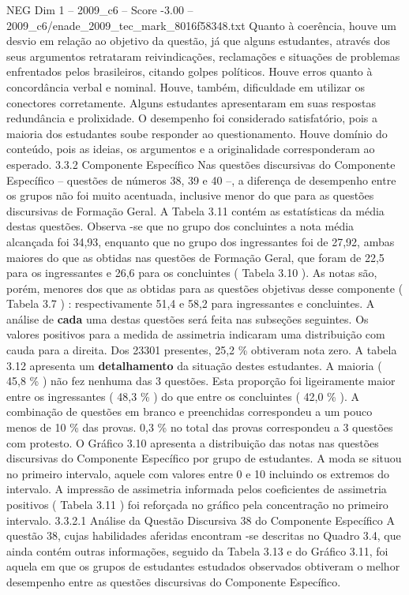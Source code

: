 \begin{textsample}{NEG Dim 1 – 2009\_c6 – Score -3.00 – 2009\_c6/enade\_2009\_tec\_mark\_8016f58348.txt}
Quanto à coerência, houve um desvio em relação ao objetivo da questão, já que alguns estudantes, através dos seus argumentos retrataram reivindicações, reclamações e situações de problemas enfrentados pelos brasileiros, citando golpes políticos.
Houve erros quanto à concordância verbal e nominal.
Houve, também, dificuldade em utilizar os conectores corretamente.
Alguns estudantes apresentaram em suas respostas redundância e prolixidade.
O desempenho foi considerado satisfatório, pois a maioria dos estudantes soube responder ao questionamento.
Houve domínio do conteúdo, pois as ideias, os argumentos e a originalidade corresponderam ao esperado. 3.3.2 Componente Específico Nas questões discursivas do Componente Específico – questões de números 38, 39 e 40 –, a diferença de desempenho entre os grupos não foi muito acentuada, inclusive menor do que para as questões discursivas de Formação Geral.
A Tabela 3.11 contém as estatísticas da média destas questões.
Observa -se que no grupo dos concluintes a nota média alcançada foi 34,93, enquanto que no grupo dos ingressantes foi de 27,92, ambas maiores do que as obtidas nas questões de Formação Geral, que foram de 22,5 para os ingressantes e 26,6 para os concluintes ( Tabela 3.10 ).
As notas são, porém, menores dos que as obtidas para as questões objetivas desse componente ( Tabela 3.7 ) : respectivamente 51,4 e 58,2 para ingressantes e concluintes.
A análise de \textbf{cada} uma destas questões será feita nas subseções seguintes.
Os valores positivos para a medida de assimetria indicaram uma distribuição com cauda para a direita.
Dos 23301 presentes, 25,2 \% obtiveram nota zero.
A tabela 3.12 apresenta um \textbf{detalhamento} da situação destes estudantes.
A maioria ( 45,8 \% ) não fez nenhuma das 3 questões.
Esta proporção foi ligeiramente maior entre os ingressantes ( 48,3 \% ) do que entre os concluintes ( 42,0 \% ).
A combinação de questões em branco e preenchidas correspondeu a um pouco menos de 10 \% das provas. 0,3 \% no total das provas correspondeu a 3 questões com protesto.
O Gráfico 3.10 apresenta a distribuição das notas nas questões discursivas do Componente Específico por grupo de estudantes.
A moda se situou no primeiro intervalo, aquele com valores entre 0 e 10 incluindo os extremos do intervalo.
A impressão de assimetria informada pelos coeficientes de assimetria positivos ( Tabela 3.11 ) foi reforçada no gráfico pela concentração no primeiro intervalo. 3.3.2.1 Análise da Questão Discursiva 38 do Componente Específico A questão 38, cujas habilidades aferidas encontram -se descritas no Quadro 3.4, que ainda contém outras informações, seguido da Tabela 3.13 e do Gráfico 3.11, foi aquela em que os grupos de estudantes estudados observados obtiveram o melhor desempenho entre as questões discursivas do Componente Específico.

\end{textsample}
